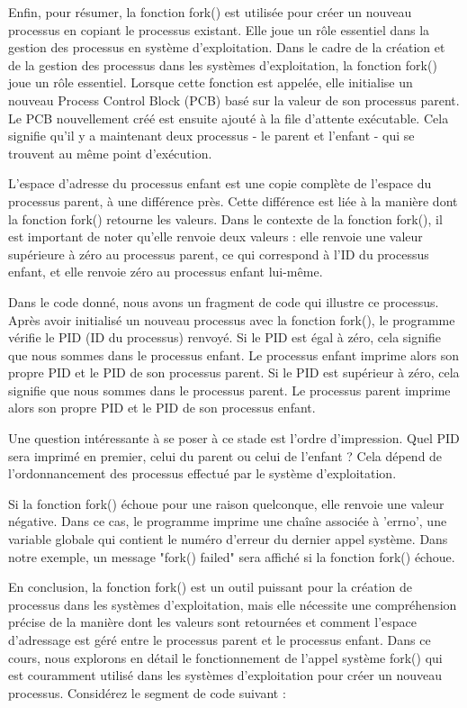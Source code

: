 \documentclass[12pt]{article}
\begin{document}
Enfin, pour résumer, la fonction fork() est utilisée pour créer un nouveau processus en copiant le processus existant. Elle joue un rôle essentiel dans la gestion des processus en système d'exploitation.
Dans le cadre de la création et de la gestion des processus dans les systèmes d'exploitation, la fonction fork() joue un rôle essentiel. Lorsque cette fonction est appelée, elle initialise un nouveau Process Control Block (PCB) basé sur la valeur de son processus parent. Le PCB nouvellement créé est ensuite ajouté à la file d'attente exécutable. Cela signifie qu'il y a maintenant deux processus - le parent et l'enfant - qui se trouvent au même point d'exécution.

L'espace d'adresse du processus enfant est une copie complète de l'espace du processus parent, à une différence près. Cette différence est liée à la manière dont la fonction fork() retourne les valeurs. Dans le contexte de la fonction fork(), il est important de noter qu'elle renvoie deux valeurs : elle renvoie une valeur supérieure à zéro au processus parent, ce qui correspond à l'ID du processus enfant, et elle renvoie zéro au processus enfant lui-même.

Dans le code donné, nous avons un fragment de code qui illustre ce processus. Après avoir initialisé un nouveau processus avec la fonction fork(), le programme vérifie le PID (ID du processus) renvoyé. Si le PID est égal à zéro, cela signifie que nous sommes dans le processus enfant. Le processus enfant imprime alors son propre PID et le PID de son processus parent. Si le PID est supérieur à zéro, cela signifie que nous sommes dans le processus parent. Le processus parent imprime alors son propre PID et le PID de son processus enfant.

Une question intéressante à se poser à ce stade est l'ordre d'impression. Quel PID sera imprimé en premier, celui du parent ou celui de l'enfant ? Cela dépend de l'ordonnancement des processus effectué par le système d'exploitation.

Si la fonction fork() échoue pour une raison quelconque, elle renvoie une valeur négative. Dans ce cas, le programme imprime une chaîne associée à 'errno', une variable globale qui contient le numéro d'erreur du dernier appel système. Dans notre exemple, un message "fork() failed" sera affiché si la fonction fork() échoue.

En conclusion, la fonction fork() est un outil puissant pour la création de processus dans les systèmes d'exploitation, mais elle nécessite une compréhension précise de la manière dont les valeurs sont retournées et comment l'espace d'adressage est géré entre le processus parent et le processus enfant.
Dans ce cours, nous explorons en détail le fonctionnement de l'appel système fork() qui est couramment utilisé dans les systèmes d'exploitation pour créer un nouveau processus. Considérez le segment de code suivant :
\end{document}
